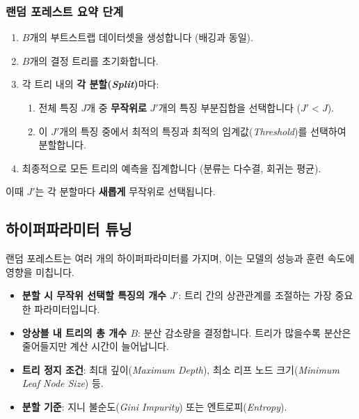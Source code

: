 \documentclass[11pt,a4paper]{book}
\theoremstyle{definition}
\begin{document}
\subsubsection*{랜덤 포레스트 요약 단계}
\begin{enumerate}
    \item $B$개의 부트스트랩 데이터셋을 생성합니다 (배깅과 동일).
    \item $B$개의 결정 트리를 초기화합니다.
    \item 각 트리 내의 \textbf{각 분할(\emph{Split})}마다:
    \begin{enumerate}
        \item 전체 특징 $J$개 중 \textbf{무작위로} $J'$개의 특징 부분집합을 선택합니다 ($J' < J$).
        \item 이 $J'$개의 특징 중에서 최적의 특징과 최적의 임계값(\emph{Threshold})를 선택하여 분할합니다.
    \end{enumerate}
    \item 최종적으로 모든 트리의 예측을 집계합니다 (분류는 다수결, 회귀는 평균).
\end{enumerate}
이때 $J'$는 각 분할마다 \textbf{새롭게} 무작위로 선택됩니다.

\subsection{하이퍼파라미터 튜닝}

랜덤 포레스트는 여러 개의 하이퍼파라미터를 가지며, 이는 모델의 성능과 훈련 속도에 영향을 미칩니다.

\begin{tcolorbox}[infobox, title={주요 하이퍼파라미터}]
\begin{itemize}
    \item \textbf{분할 시 무작위 선택할 특징의 개수 $J'$}: 트리 간의 상관관계를 조절하는 가장 중요한 파라미터입니다.
    \item \textbf{앙상블 내 트리의 총 개수 $B$}: 분산 감소량을 결정합니다. 트리가 많을수록 분산은 줄어들지만 계산 시간이 늘어납니다.
    \item \textbf{트리 정지 조건}: 최대 깊이(\emph{Maximum Depth}), 최소 리프 노드 크기(\emph{Minimum Leaf Node Size}) 등.
    \item \textbf{분할 기준}: 지니 불순도(\emph{Gini Impurity}) 또는 엔트로피(\emph{Entropy}).
\end{itemize}
\end{tcolorbox}
\end{document}
